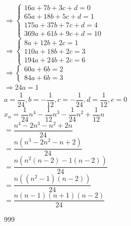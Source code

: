 \documentclass[a4paper]{article}
\begin{document}
$ \Rightarrow \left \{
\begin{array}{l}
16a + 7b + 3c + d = 0\\

65a + 18b + 5c + d = 1\\

175a + 37b + 7c + d = 4\\

369a + 61b + 9c + d = 10
\end{array}
\right .$\\

$ \Rightarrow \left \{
\begin{array}{l}
8a + 12b + 2c = 1\\

110a + 18b + 2c = 3\\

194a + 24b + 2c = 6
\end{array}
\right .$\\

$ \Rightarrow \left \{
\begin{array}{l}
60a + 6b = 2\\

84a + 6b = 3
\end{array}
\right .$\\

$ \Rightarrow 24a = 1$\\

$a = \dfrac{1}{24}, b = -\dfrac{1}{12}, c = -\dfrac{1}{24}, d = \dfrac{1}{12}, e = 0$\\

$x_n = \dfrac{1}{24}n^4 - \dfrac{1}{12}n^3 - \dfrac{1}{24}n^2 + \dfrac{1}{12}n$\\

$= \dfrac{n^4 - 2n^3 - n^2 + 2n}{24}$\\

$= \dfrac{n(n^3 - 2n^2 - n + 2)}{24}$\\

$= \dfrac{n(n^2(n-2) - 1(n-2))}{24}$\\

$= \dfrac{n((n^2 - 1)(n-2))}{24}$\\

$= \dfrac{n(n-1)(n+1)(n-2)}{24}$\\

\begin{thebibliography}{999}
\end{thebibliography}
\end{document}
